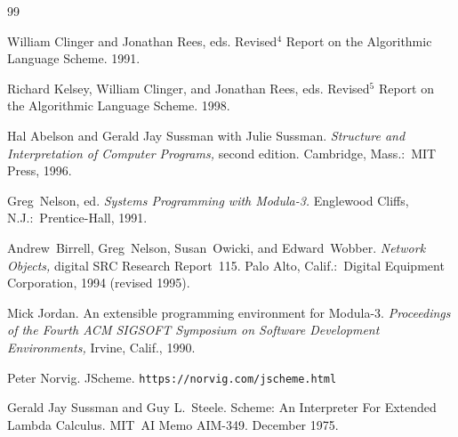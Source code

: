 \documentclass[12pt]{report}
\begin{document}
\newpage
{
\frenchspacing
\begin{thebibliography}{99}

 William Clinger and Jonathan Rees, eds.
Revised$^4$ Report on the Algorithmic Language Scheme.  1991.

 Richard Kelsey, William Clinger, and Jonathan Rees, eds.
Revised$^5$ Report on the Algorithmic Language Scheme.  1998.

 Hal Abelson and Gerald Jay Sussman with Julie Sussman.
{\it Structure and Interpretation of Computer Programs,} second edition.
Cambridge, Mass.:\ MIT Press, 1996.

 Greg~Nelson, ed.  {\it Systems Programming with Modula-3.}
Englewood Cliffs, N.J.:\ Prentice-Hall, 1991.

 Andrew~Birrell, Greg~Nelson, Susan~Owicki, and Edward~Wobber.
{\it Network Objects,} digital SRC Research Report~115.
Palo Alto, Calif.:\ Digital Equipment Corporation, 1994 (revised 1995).

 Mick Jordan.  An extensible programming environment for Modula-3.
{\it Proceedings of the Fourth ACM SIGSOFT Symposium on Software
Development Environments,} Irvine, Calif., 1990.

 Peter Norvig.  JScheme.
{\tt https://norvig.com/jscheme.html}

 Gerald Jay Sussman and Guy L.~Steele.
Scheme: An Interpreter For Extended Lambda Calculus.
MIT~AI Memo AIM-349.  December 1975.

\end{thebibliography}
}
\end{document}
